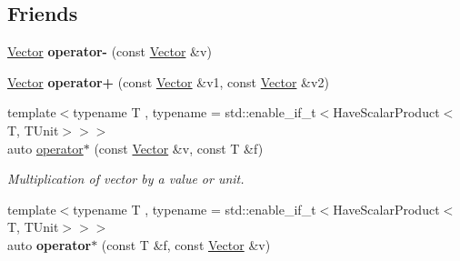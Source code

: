 \subsection*{Friends}
\begin{DoxyCompactItemize}
\item 
\hypertarget{classVector_3_01TUnit_00_01d_00_01std_1_1enable__if__t_3_01IsFloatSpecialization_3_01TUnit_00_01d_01_4_01_4_01_4_ac7a74ab9b64a6ddb03e7d25895c2699d}{}\label{classVector_3_01TUnit_00_01d_00_01std_1_1enable__if__t_3_01IsFloatSpecialization_3_01TUnit_00_01d_01_4_01_4_01_4_ac7a74ab9b64a6ddb03e7d25895c2699d} 
\hyperlink{classVector}{Vector} {\bfseries operator-\/} (const \hyperlink{classVector}{Vector} \&v)
\item 
\hypertarget{classVector_3_01TUnit_00_01d_00_01std_1_1enable__if__t_3_01IsFloatSpecialization_3_01TUnit_00_01d_01_4_01_4_01_4_a06ca8cbab2b706b2a4e6b21ed24e0087}{}\label{classVector_3_01TUnit_00_01d_00_01std_1_1enable__if__t_3_01IsFloatSpecialization_3_01TUnit_00_01d_01_4_01_4_01_4_a06ca8cbab2b706b2a4e6b21ed24e0087} 
\hyperlink{classVector}{Vector} {\bfseries operator+} (const \hyperlink{classVector}{Vector} \&v1, const \hyperlink{classVector}{Vector} \&v2)
\item 
\hypertarget{classVector_3_01TUnit_00_01d_00_01std_1_1enable__if__t_3_01IsFloatSpecialization_3_01TUnit_00_01d_01_4_01_4_01_4_a3eaf9b57ef16c9a1fb0118c56879c95f}{}\label{classVector_3_01TUnit_00_01d_00_01std_1_1enable__if__t_3_01IsFloatSpecialization_3_01TUnit_00_01d_01_4_01_4_01_4_a3eaf9b57ef16c9a1fb0118c56879c95f} 
{\footnotesize template$<$typename T , typename  = std\+::enable\+\_\+if\+\_\+t$<$\+Have\+Scalar\+Product$<$\+T, T\+Unit$>$$>$$>$ }\\auto \hyperlink{classVector_3_01TUnit_00_01d_00_01std_1_1enable__if__t_3_01IsFloatSpecialization_3_01TUnit_00_01d_01_4_01_4_01_4_a3eaf9b57ef16c9a1fb0118c56879c95f}{operator$\ast$} (const \hyperlink{classVector}{Vector} \&v, const T \&f)
\begin{DoxyCompactList}\small\item\em Multiplication of vector by a value or unit. \end{DoxyCompactList}\item 
\hypertarget{classVector_3_01TUnit_00_01d_00_01std_1_1enable__if__t_3_01IsFloatSpecialization_3_01TUnit_00_01d_01_4_01_4_01_4_af420d50c780cdeadc7e2639c49be58b6}{}\label{classVector_3_01TUnit_00_01d_00_01std_1_1enable__if__t_3_01IsFloatSpecialization_3_01TUnit_00_01d_01_4_01_4_01_4_af420d50c780cdeadc7e2639c49be58b6} 
{\footnotesize template$<$typename T , typename  = std\+::enable\+\_\+if\+\_\+t$<$\+Have\+Scalar\+Product$<$\+T, T\+Unit$>$$>$$>$ }\\auto {\bfseries operator$\ast$} (const T \&f, const \hyperlink{classVector}{Vector} \&v)

\end{DoxyCompactItemize}
